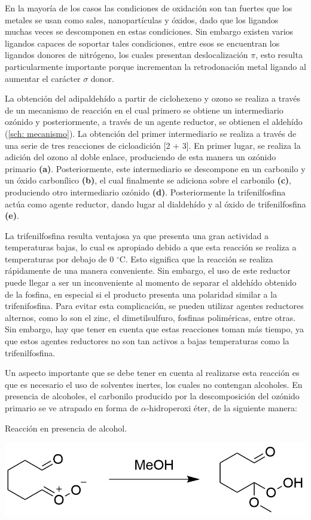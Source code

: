 \documentclass[fleqn,10pt]{SelfArx}
\begin{document}
En la mayor\'ia de los casos las condiciones de oxidaci\'on son tan fuertes que los metales se usan como sales, nanopart\'iculas y \'oxidos, dado que los ligandos muchas veces se descomponen en estas condiciones. Sin embargo existen varios ligandos capaces de soportar tales condiciones, entre esos se encuentran los ligandos donores de nitr\'ogeno, los cuales presentan deslocalizaci\'on $\pi$, esto resulta particularmente importante porque incrementan la retrodonaci\'on metal ligando al aumentar el car\'acter $\sigma$ donor\cite{Daw2014}.

La obtención del adipaldehído a partir de ciclohexeno y ozono se realiza a través de un mecanismo de reacción en el cual primero se obtiene un intermediario ozónido y posteriormente, a través de un agente reductor, se obtienen el aldehído\cite{Carey2007} (\autoref{sch: mecanismo}). La obtención del primer intermediario se realiza a través de una serie de tres reacciones de cicloadición [2 + 3]\cite{Criegee1975}. En primer lugar, se realiza la adición del ozono al doble enlace, produciendo de esta manera un ozónido primario \textbf{(a)}. Posteriormente, este intermediario se descompone en un carbonilo y un óxido carbonílico \textbf{(b)}, el cual finalmente se adiciona sobre el carbonilo \textbf{(c)}, produciendo otro intermediario ozónido \textbf{(d)}\cite{Wade2013}. Posteriormente la trifenilfosfina act\'ua como agente reductor, dando lugar al dialdeh\'ido y al \'oxido de trifenilfosfina \textbf{(e)}.

La trifenilfosfina resulta ventajosa ya que presenta una gran actividad a temperaturas bajas, lo cual es apropiado debido a que esta reacción se realiza a temperaturas por debajo de 0 $^\circ$C. Esto significa que la reacción se realiza rápidamente de una manera conveniente\cite{Knowles1960}. Sin embargo, el uso de este reductor puede llegar a ser un inconveniente al momento de separar el aldehído obtenido de la fosfina, en especial si el producto presenta una polaridad similar a la trifenifosfina\cite{doi:10.1080/00397918608057738}. Para evitar esta complicación, se pueden utilizar agentes reductores alternos, como lo son el zinc, el dimetilsulfuro, fosfinas poliméricas, entre otras\cite{Wade2013}\cite{doi:10.1080/00397918608057738}. Sin embargo, hay que tener en cuenta que estas reacciones toman más tiempo, ya que estos agentes reductores no son tan activos a bajas temperaturas como la trifenilfosfina.

Un aspecto importante que se debe tener en cuenta al realizarse esta reacción es que es necesario el uso de solventes inertes, los cuales no contengan alcoholes. En presencia de alcoholes, el carbonilo producido por la descomposición del ozónido primario se ve atrapado en forma de $\alpha$-hidroperoxi éter\cite{Keaveney1967}, de la siguiente manera:
\begin{scheme}[h]
	\centering
	\caption{Reacci\'on en presencia de alcohol.}
	\includegraphics[width=0.7\linewidth]{structures/metanol.png}
\end{scheme}
\end{document}
